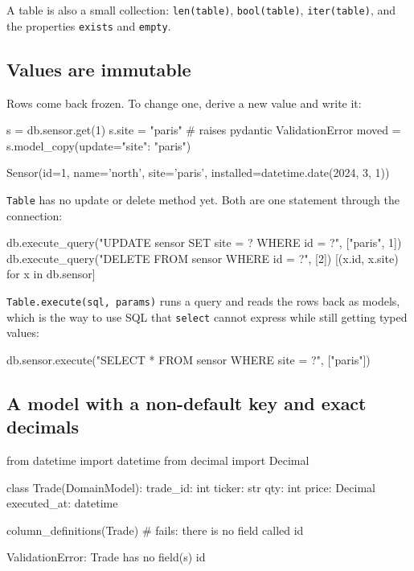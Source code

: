 \documentclass[11pt,a4paper]{article}
\newcommand{\code}[1]{\texttt{#1}}
\begin{document}
A table is also a small collection: \code{len(table)}, \code{bool(table)},
\code{iter(table)}, and the properties \code{exists} and \code{empty}.

\subsection{Values are immutable}

Rows come back frozen. To change one, derive a new value and write it:

\begin{python}
s = db.sensor.get(1)
s.site = "paris"                                   # raises pydantic ValidationError
moved = s.model_copy(update={"site": "paris"})
\end{python}
\begin{console}
Sensor(id=1, name='north', site='paris', installed=datetime.date(2024, 3, 1))
\end{console}

\code{Table} has no update or delete method yet. Both are one statement through the
connection:

\begin{python}
db.execute_query("UPDATE sensor SET site = ? WHERE id = ?", ["paris", 1])
db.execute_query("DELETE FROM sensor WHERE id = ?", [2])
[(x.id, x.site) for x in db.sensor]
\end{python}
\begin{console}
\end{console}

\code{Table.execute(sql, params)} runs a query and reads the rows back as models, which is
the way to use SQL that \code{select} cannot express while still getting typed values:

\begin{python}
db.sensor.execute("SELECT * FROM sensor WHERE site = ?", ["paris"])
\end{python}
\begin{console}
[Sensor(id=1, name='north', site='paris', installed=datetime.date(2024, 3, 1))]
\end{console}

\subsection{A model with a non-default key and exact decimals}

\begin{python}
from datetime import datetime
from decimal import Decimal

class Trade(DomainModel):
    trade_id: int
    ticker: str
    qty: int
    price: Decimal
    executed_at: datetime

column_definitions(Trade)          # fails: there is no field called id
\end{python}
\begin{console}
ValidationError: Trade has no field(s) id
\end{console}
\end{document}
